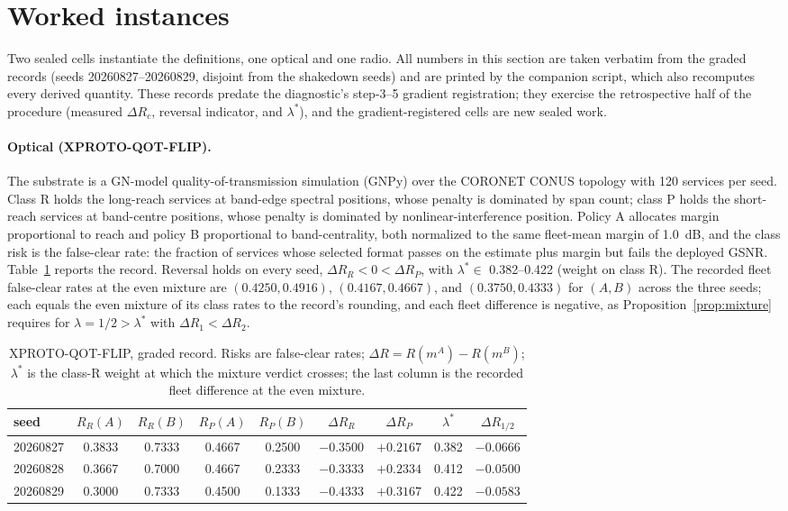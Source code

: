 \documentclass[11pt]{article}
\theoremstyle{definition}
\theoremstyle{remark}
\newcommand{\lamstar}{\lambda^{*}}
\begin{document}
\section{Worked instances}\label{sec:worked}

Two sealed cells instantiate the definitions, one optical and one radio.
All numbers in this section are taken verbatim from the graded records
(seeds 20260827--20260829, disjoint from the shakedown seeds) and are
printed by the companion script, which also recomputes every derived
quantity. These records predate the diagnostic's step-3--5 gradient
registration; they exercise the retrospective half of the procedure
(measured $\Delta R_c$, reversal indicator, and $\lamstar$), and the
gradient-registered cells are new sealed work.

\paragraph{Optical (XPROTO-QOT-FLIP).}
The substrate is a GN-model quality-of-transmission simulation (GNPy) over
the CORONET CONUS topology with 120 services per seed. Class R holds the
long-reach services at band-edge spectral positions, whose penalty is
dominated by span count; class P holds the short-reach services at
band-centre positions, whose penalty is dominated by nonlinear-interference
position. Policy A allocates margin proportional to reach and policy B
proportional to band-centrality, both normalized to the same fleet-mean
margin of 1.0~dB, and the class risk is the false-clear rate: the fraction
of services whose selected format passes on the estimate plus margin but
fails the deployed GSNR. Table~\ref{tab:qot} reports the record. Reversal
holds on every seed, $\Delta R_R < 0 < \Delta R_P$, with
$\lamstar \in$ 0.382--0.422 (weight on class R). The recorded fleet
false-clear rates at the even mixture are $(0.4250, 0.4916)$,
$(0.4167, 0.4667)$, and $(0.3750, 0.4333)$ for $(A, B)$ across the three
seeds; each equals the even mixture of its class rates to the record's
rounding, and each fleet difference is negative, as
Proposition~\ref{prop:mixture} requires for $\lambda = 1/2 > \lamstar$ with
$\Delta R_1 < \Delta R_2$.

\begin{table}[htbp]
\centering
\caption{XPROTO-QOT-FLIP, graded record. Risks are false-clear rates;
$\Delta R = R(m^A) - R(m^B)$; $\lamstar$ is the class-R weight at which the
mixture verdict crosses; the last column is the recorded fleet difference at
the even mixture.}
\label{tab:qot}
\begin{tabular}{lcccccccc}
\toprule
seed & $R_R(A)$ & $R_R(B)$ & $R_P(A)$ & $R_P(B)$ & $\Delta R_R$ &
$\Delta R_P$ & $\lamstar$ & $\Delta R_{1/2}$ \\
\midrule
20260827 & 0.3833 & 0.7333 & 0.4667 & 0.2500 & $-0.3500$ & $+0.2167$ & 0.382 & $-0.0666$ \\
20260828 & 0.3667 & 0.7000 & 0.4667 & 0.2333 & $-0.3333$ & $+0.2334$ & 0.412 & $-0.0500$ \\
20260829 & 0.3000 & 0.7333 & 0.4500 & 0.1333 & $-0.4333$ & $+0.3167$ & 0.422 & $-0.0583$ \\
\bottomrule
\end{tabular}
\end{table}
\end{document}
